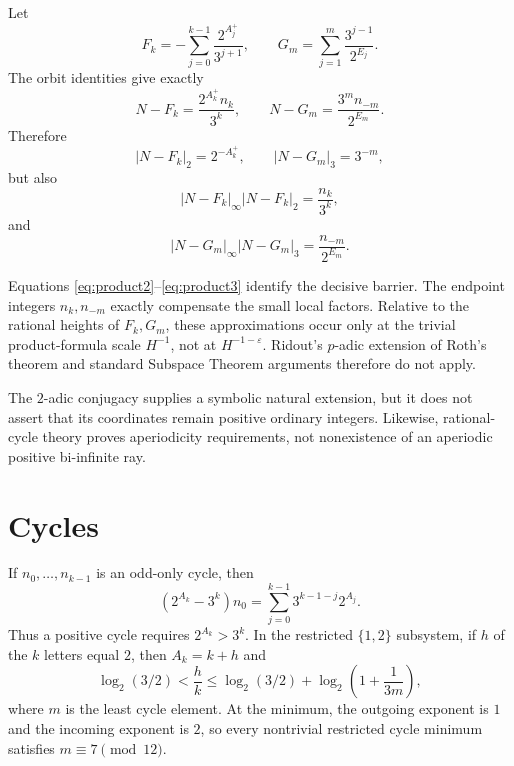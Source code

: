 \documentclass[11pt,reqno]{amsart}
\theoremstyle{plain}
\theoremstyle{definition}
\numberwithin{equation}{section}
\begin{document}
Let
\[
F_k=-\sum_{j=0}^{k-1}\frac{2^{A_j^+}}{3^{j+1}},
\qquad
G_m=\sum_{j=1}^{m}\frac{3^{j-1}}{2^{E_j}}.
\]
The orbit identities give exactly
\begin{equation}\label{eq:errors}
N-F_k=\frac{2^{A_k^+}n_k}{3^k},
\qquad
N-G_m=\frac{3^mn_{-m}}{2^{E_m}}.
\end{equation}
Therefore
\[
|N-F_k|_2=2^{-A_k^+},
\qquad
|N-G_m|_3=3^{-m},
\]
but also
\begin{equation}\label{eq:product2}
|N-F_k|_\infty|N-F_k|_2
=\frac{n_k}{3^k},
\end{equation}
and
\begin{equation}\label{eq:product3}
|N-G_m|_\infty|N-G_m|_3
=\frac{n_{-m}}{2^{E_m}}.
\end{equation}

Equations \eqref{eq:product2}--\eqref{eq:product3} identify the decisive
barrier.  The endpoint integers $n_k,n_{-m}$ exactly compensate the small
local factors.  Relative to the rational heights of $F_k,G_m$, these
approximations occur only at the trivial product-formula scale $H^{-1}$, not
at $H^{-1-\varepsilon}$.  Ridout's $p$-adic extension of Roth's theorem
\cite{ridout1958} and standard Subspace Theorem arguments therefore do not
apply.

The $2$-adic conjugacy \cite{bernsteinlagarias1996} supplies a symbolic
natural extension, but it does not assert that its coordinates remain positive
ordinary integers.  Likewise, rational-cycle theory \cite{lagarias1990} proves
aperiodicity requirements, not nonexistence of an aperiodic positive
bi-infinite ray.

\section{Cycles}
\label{sec:cycles}

If $n_0,\ldots,n_{k-1}$ is an odd-only cycle, then
\begin{equation}\label{eq:cycle}
(2^{A_k}-3^k)n_0
=\sum_{j=0}^{k-1}3^{k-1-j}2^{A_j}.
\end{equation}
Thus a positive cycle requires $2^{A_k}>3^k$.  In the restricted
$\{1,2\}$ subsystem, if $h$ of the $k$ letters equal $2$, then $A_k=k+h$ and
\begin{equation}\label{eq:cyclebound}
\log_2(3/2)
<\frac hk
\le
\log_2(3/2)+\log_2\left(1+\frac1{3m}\right),
\end{equation}
where $m$ is the least cycle element.  At the minimum, the outgoing exponent
is $1$ and the incoming exponent is $2$, so every nontrivial restricted cycle
minimum satisfies $m\equiv7\pmod{12}$.
\end{document}
